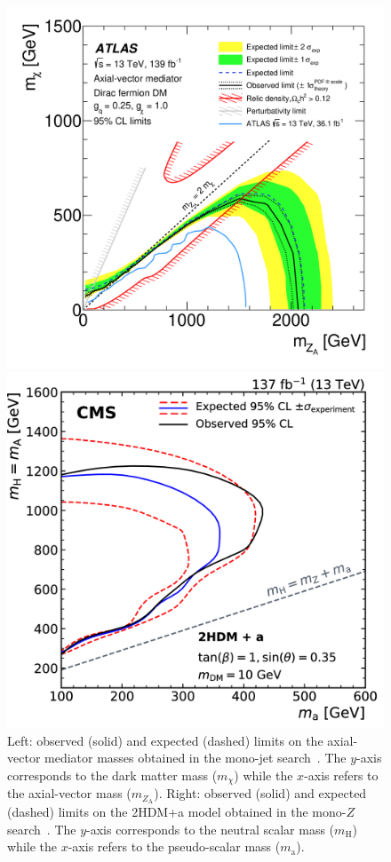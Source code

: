 \documentclass{moriond}
\begin{document}
\begin{figure} [htb]
\begin{minipage}{0.45\linewidth}
\centerline{\includegraphics[width=0.8\linewidth]{monojet}}
\end{minipage}
\begin{minipage}{0.45\linewidth}
\centerline{\includegraphics[width=0.8\linewidth]{monoz}}
\end{minipage}
\caption[]{Left: observed (solid) and expected (dashed) limits on the axial-vector mediator masses obtained in the mono-jet search~\cite{monojet}. The $y$-axis corresponds to the dark matter mass ($m_{\chi}$) while the $x$-axis refers to the axial-vector mass ($m_{Z_{\mathrm{A}}}$). Right: observed (solid) and expected (dashed) limits on the 2HDM+a model obtained in the mono-$Z$ search~\cite{monoz}. The $y$-axis corresponds to the neutral scalar mass ($m_{\mathrm{H}}$) while the $x$-axis refers to the pseudo-scalar mass ($m_{\mathrm{a}}$).}
\label{fig:mono_jet_z}
\end{figure}
\end{document}
